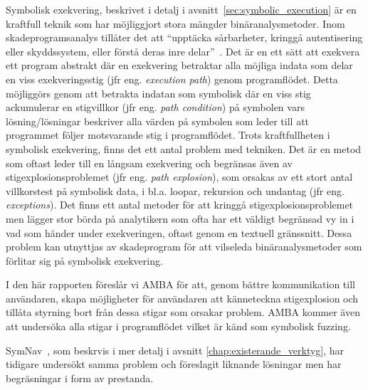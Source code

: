 Symbolisk exekvering, beskrivet i detalj i avsnitt~\ref{sec:symbolic_execution}
är en kraftfull teknik som har möjliggjort stora mängder
binäranalysmetoder\cite{survey_symb_exc, symnav}. Inom skadeprogramsanalys
tillåter det att ``upptäcka sårbarheter, kringgå autentisering eller
skyddssystem, eller förstå deras inre delar''~\cite{symnav}. Det är en ett sätt
att exekvera ett program abstrakt där en exekvering betraktar alla möjliga
indata som delar en viss exekveringsstig (jfr eng. \emph{execution path}) genom
programflödet. Detta möjliggörs genom att betrakta indatan som symbolisk där en
viss stig ackumulerar en stigvillkor (jfr eng. \emph{path condition}) på
symbolen vars lösning/lösningar beskriver alla värden på symbolen som leder
till att programmet följer motsvarande stig i programflödet. Trots
kraftfullheten i symbolisk exekvering, finns det ett antal problem med
tekniken. Det är en metod som oftast leder till en långsam exekvering och
begränsas även av stigexplosionsproblemet (jfr eng. \emph{path explosion}), som
orsakas av ett stort antal villkorstest på symbolisk data, i bl.a. loopar,
rekursion och undantag (jfr eng. \emph{exceptions}). Det finns ett antal
metoder för att kringgå stigexplosionsproblemet men lägger stor börda på
analytikern som ofta har ett väldigt begränsad vy in i vad som händer under
exekveringen, oftast genom en textuell gränssnitt. Dessa problem kan utnyttjas
av skadeprogram för att vilseleda binäranalysmetoder som förlitar sig på
symbolisk exekvering.

I den här rapporten föreslår vi AMBA för att, genom bättre kommunikation till
användaren, skapa möjligheter för användaren att känneteckna stigexplosion och
tillåta styrning bort från dessa stigar som orsakar problem. AMBA kommer även
att undersöka alla stigar i programflödet vilket är känd som symbolisk fuzzing.

SymNav~\cite{symnav}, som beskrvis i mer detalj i avsnitt
\ref{chap:existerande_verktyg}, har tidigare undersökt samma problem och
föreslagit liknande lösningar men har
begräsningar i form av prestanda.


